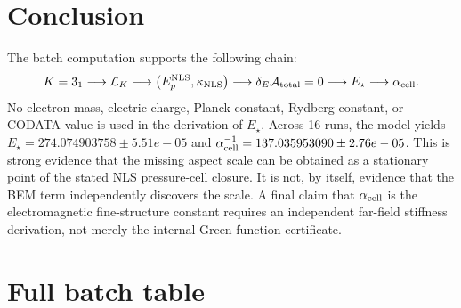 \documentclass[11pt]{article}
\newcommand{\LK}{\mathcal L_K}
\newcommand{\Estar}{E_\star}
\newcommand{\alphacell}{\alpha_{\rm cell}}
\begin{document}
\section{Conclusion}

The batch computation supports the following chain:
\[
K=3_1
\longrightarrow
\LK
\longrightarrow
\left(E_p^{\rm NLS},\kappa_{\rm NLS}\right)
\longrightarrow
\delta_E\mathcal A_{\rm total}=0
\longrightarrow
\Estar
\longrightarrow
\alphacell.
\]
No electron mass, electric charge, Planck constant, Rydberg constant, or CODATA value is used in the derivation of \(\Estar\). Across 16 runs, the model yields \(\Estar=274.074903758\pm 5.51e-05\) and \(\alphacell^{-1}=137.035953090\pm 2.76e-05\). This is strong evidence that the missing aspect scale can be obtained as a stationary point of the stated NLS pressure-cell closure.  It is not, by itself, evidence that the BEM term independently discovers the scale.  A final claim that \(\alphacell\) is the electromagnetic fine-structure constant requires an independent far-field stiffness derivation, not merely the internal Green-function certificate.

\appendix
\section{Full batch table}
\end{document}
